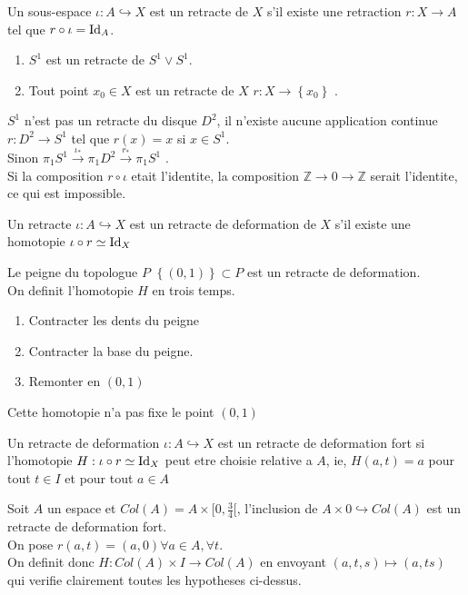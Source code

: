 \documentclass[../main.tex]{subfiles}
\begin{document}
\begin{defn}[Retracte]
	Un sous-espace $\iota: A\hookrightarrow X$ est un retracte de $X$  s'il existe une retraction $r:X\to A$ tel que $r\circ \iota= \operatorname{Id}_A$.
\end{defn}
\begin{exemple}
\begin{enumerate}
\item $S^1$ est un retracte de $S^1 \vee S^{1}$.\\

\item Tout point $x_0\in X$ est un retracte de $X$ $r: X\to \left\{ x_0 \right\} $ .
\end{enumerate}
\end{exemple}
\begin{rmq}
$S^{1}$ n'est pas un retracte du disque $D^{2}$, il n'existe aucune application continue $r: D^{2} \to S^{1}$ tel que $r( x) = x $ si $x\in S^{1}$.\\
Sinon $ \pi_1S^{1}\xrightarrow{\iota_\ast} \pi_1 D^{2} \xrightarrow{r_\ast} \pi_1 S^{1}$ .\\
Si la composition $r\circ \iota$ etait l'identite, la composition $ \mathbb{Z}\to 0 \to \mathbb{Z} $ serait l'identite, ce qui est impossible.
\end{rmq}
\begin{defn}
	Un retracte $\iota: A \hookrightarrow X$ est un retracte de deformation de $X$ s'il existe une homotopie $\iota \circ r \simeq \operatorname{Id}_X$
\end{defn}
\begin{exemple}
Le peigne du topologue $P$ $ \left\{ ( 0,1)  \right\} \subset P$ est un retracte de deformation.\\
On definit l'homotopie $H$ en trois temps.
\begin{enumerate}
\item Contracter les dents du peigne
\item Contracter la base du peigne.
\item Remonter en $ ( 0,1) $ 
\end{enumerate}
Cette homotopie n'a pas fixe le point $ ( 0,1) $ 
\end{exemple}
\begin{defn}
	Un retracte de deformation $\iota: A\hookrightarrow X$ est un retracte de deformation fort si l'homotopie $H: \iota\circ r \simeq \operatorname{Id}_X$ peut etre choisie relative a $A$, ie, $H( a,t) =a$ pour tout $t\in I$ et pour tout $a\in A$ 
\end{defn}
\begin{exemple}[Le collier]
	Soit $A$ un espace et $ Col( A) = A \times [ 0, \frac{3}{4}[ $, l'inclusion de $A\times 0\hookrightarrow Col( A) $ est un retracte de deformation fort.\\
	On pose $r( a,t) = ( a,0) \forall a\in A, \forall t$.\\
	On definit donc $H: Col( A) \times I \to Col( A) $ en envoyant $( a,t,s) \mapsto ( a,ts) $ qui verifie clairement toutes les hypotheses ci-dessus.
\end{exemple}

	

		
\end{document}
